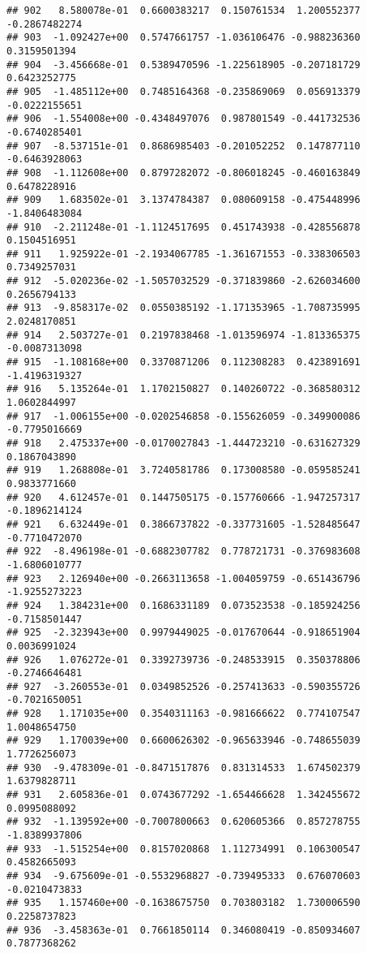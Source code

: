 \documentclass[
]{article}
\begin{document}
\begin{verbatim}
## 902   8.580078e-01  0.6600383217  0.150761534  1.200552377 -0.2867482274
## 903  -1.092427e+00  0.5747661757 -1.036106476 -0.988236360  0.3159501394
## 904  -3.456668e-01  0.5389470596 -1.225618905 -0.207181729  0.6423252775
## 905  -1.485112e+00  0.7485164368 -0.235869069  0.056913379 -0.0222155651
## 906  -1.554008e+00 -0.4348497076  0.987801549 -0.441732536 -0.6740285401
## 907  -8.537151e-01  0.8686985403 -0.201052252  0.147877110 -0.6463928063
## 908  -1.112608e+00  0.8797282072 -0.806018245 -0.460163849  0.6478228916
## 909   1.683502e-01  3.1374784387  0.080609158 -0.475448996 -1.8406483084
## 910  -2.211248e-01 -1.1124517695  0.451743938 -0.428556878  0.1504516951
## 911   1.925922e-01 -2.1934067785 -1.361671553 -0.338306503  0.7349257031
## 912  -5.020236e-02 -1.5057032529 -0.371839860 -2.626034600  0.2656794133
## 913  -9.858317e-02  0.0550385192 -1.171353965 -1.708735995  2.0248170851
## 914   2.503727e-01  0.2197838468 -1.013596974 -1.813365375 -0.0087313098
## 915  -1.108168e+00  0.3370871206  0.112308283  0.423891691 -1.4196319327
## 916   5.135264e-01  1.1702150827  0.140260722 -0.368580312  1.0602844997
## 917  -1.006155e+00 -0.0202546858 -0.155626059 -0.349900086 -0.7795016669
## 918   2.475337e+00 -0.0170027843 -1.444723210 -0.631627329  0.1867043890
## 919   1.268808e-01  3.7240581786  0.173008580 -0.059585241  0.9833771660
## 920   4.612457e-01  0.1447505175 -0.157760666 -1.947257317 -0.1896214124
## 921   6.632449e-01  0.3866737822 -0.337731605 -1.528485647 -0.7710472070
## 922  -8.496198e-01 -0.6882307782  0.778721731 -0.376983608 -1.6806010777
## 923   2.126940e+00 -0.2663113658 -1.004059759 -0.651436796 -1.9255273223
## 924   1.384231e+00  0.1686331189  0.073523538 -0.185924256 -0.7158501447
## 925  -2.323943e+00  0.9979449025 -0.017670644 -0.918651904  0.0036991024
## 926   1.076272e-01  0.3392739736 -0.248533915  0.350378806 -0.2746646481
## 927  -3.260553e-01  0.0349852526 -0.257413633 -0.590355726 -0.7021650051
## 928   1.171035e+00  0.3540311163 -0.981666622  0.774107547  1.0048654750
## 929   1.170039e+00  0.6600626302 -0.965633946 -0.748655039  1.7726256073
## 930  -9.478309e-01 -0.8471517876  0.831314533  1.674502379  1.6379828711
## 931   2.605836e-01  0.0743677292 -1.654466628  1.342455672  0.0995088092
## 932  -1.139592e+00 -0.7007800663  0.620605366  0.857278755 -1.8389937806
## 933  -1.515254e+00  0.8157020868  1.112734991  0.106300547  0.4582665093
## 934  -9.675609e-01 -0.5532968827 -0.739495333  0.676070603 -0.0210473833
## 935   1.157460e+00 -0.1638675750  0.703803182  1.730006590  0.2258737823
## 936  -3.458363e-01  0.7661850114  0.346080419 -0.850934607  0.7877368262

\end{verbatim}
\end{document}
